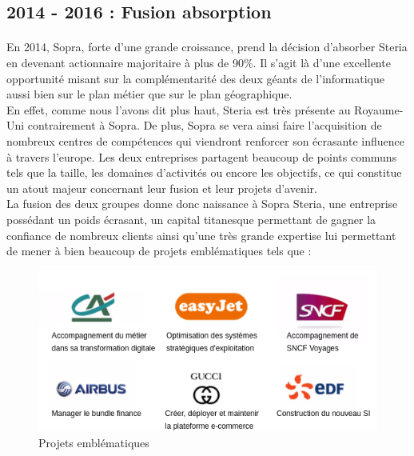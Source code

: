 \subsection{2014 - 2016 : Fusion absorption}

\paragraph{}

En 2014, Sopra, forte d'une grande croissance, prend la décision d'absorber Steria en devenant actionnaire majoritaire à plus de 90\%. Il s'agit là d'une excellente opportunité misant sur la complémentarité des deux géants de l'informatique aussi bien sur le plan métier que sur le plan géographique. \\

En effet, comme nous l'avons dit plus haut, Steria est très présente au Royaume-Uni contrairement à Sopra. De plus, Sopra se vera ainsi faire l'acquisition de nombreux centres de compétences qui viendront renforcer son écrasante influence à travers l'europe. Les deux entreprises partagent beaucoup de points communs tels que la taille, les domaines d'activités ou encore les objectifs, ce qui constitue un atout majeur concernant leur fusion et leur projets d'avenir. \\

La fusion des deux groupes donne donc naissance à Sopra Steria, une entreprise possédant un poids écrasant, un capital titanesque permettant de gagner la confiance de nombreux clients ainsi qu'une très grande expertise lui permettant de mener à bien beaucoup de projets emblématiques tels que : \\

\begin{figure}[h]
	\includegraphics[scale=0.8]{images/entreprise/projetsEmblematiques.png}
	\centering
	\caption{Projets emblématiques}
	\label{projetsEmblematiques}
\end{figure}
		